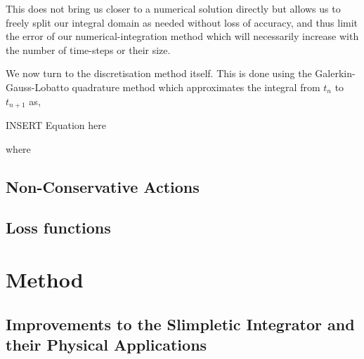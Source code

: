 \documentclass[10pt]{iopart}
\def\SI{Slimpletic Integrator}
\begin{document}
This does not bring us closer to a numerical solution directly but allows us to freely split our integral domain as needed without loss of accuracy, and thus limit the error of our numerical-integration method which will necessarily increase with the number of time-steps or their size.

We now turn to the discretisation method itself. This is done using the Galerkin-Gauss-Lobatto quadrature method which approximates the integral from $t_n$ to $t_{n + 1}$ as,

INSERT Equation here

where


%


\subsection{Non-Conservative Actions}
\subsection{Loss functions}
\label{sec:intro-lf}



\section{Method}

\subsection{Improvements to the \SI{} and their Physical Applications}
\end{document}
